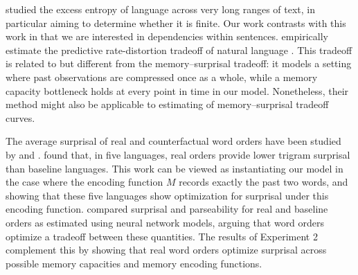 \cite{debowski-excess-2011} studied the excess entropy of language across very long ranges of text, in particular aiming to determine whether it is finite.
Our work contrasts with this work in that we are interested in dependencies within sentences.
\cite{hahn2019estimating} empirically estimate the predictive rate-distortion tradeoff of natural language \citep{still-information-2014,marzen-predictive-2016}.
This tradeoff is related to but different from the memory--surprisal tradeoff: it models a setting where past observations are compressed once as a whole, while a memory capacity bottleneck holds at every point in time in our model.
Nonetheless, their method might also be applicable to estimating of memory--surprisal tradeoff curves.


The average surprisal of real and counterfactual word orders have been studied by \citet{gildea-human-2015} and \cite{hahn2020universals}.
\citet{gildea-human-2015} found that, in five languages, real orders provide lower trigram surprisal than baseline languages.
This work can be viewed as instantiating our model in the case where the encoding function $M$ records exactly the past two words, and showing that these five languages show optimization for surprisal under this encoding function.
\citet{hahn2020universals} compared surprisal and parseability for real and baseline orders as estimated using neural network models, arguing that word orders optimize a tradeoff between these quantities.
The results of Experiment 2 complement this by showing that real word orders optimize surprisal across possible memory capacities and memory encoding functions.





